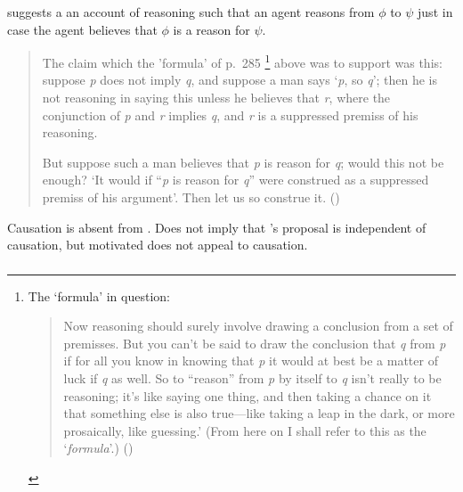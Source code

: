 \begin{note}
  \citeauthor{Thomson:1965vv} suggests a an account of reasoning such that an agent reasons from \(\phi\) to \(\psi\) just in case the agent believes that \(\phi\) is a reason for \(\psi\).
  \begin{quote}
    The claim which the 'formula' of p.\ 285\nolinebreak
    \footnote{
      The `formula' in question:
      \begin{quote}
        Now reasoning should surely involve drawing a conclusion from a set of premisses.
        But you can't be said to draw the conclusion that \emph{q} from \emph{p} if for all you know in knowing that \emph{p} it would at best be a matter of luck if \emph{q} as well.
        So to ``reason'' from \emph{p} by itself to \emph{q} isn't really to be reasoning; it's like saying one thing, and then taking a chance on it that something else is also true---like taking a leap in the dark, or more prosaically, like guessing.'
        (From here on I shall refer to this as the `\emph{formula}'.)\nolinebreak
        \mbox{}\hfill\mbox{(\citeyear[285]{Thomson:1965vv})}
      \end{quote}
    }
    above was to support was this:
    suppose \emph{p} does not imply \emph{q}, and suppose a man says `\emph{p}, so \emph{q}';
    then he is not reasoning in saying this unless he believes that \emph{r}, where the conjunction of \emph{p} and \emph{r} implies \emph{q}, and \emph{r} is a suppressed premiss of his reasoning.\par
    But suppose such a man believes that \emph{p} is reason for \emph{q}; would this not be enough?
    `It would if ``\emph{p} is reason for \emph{q}'' were construed as a suppressed premiss of his argument'.
    Then let us so construe it.\newline
    \mbox{}\hfill\mbox{(\citeyear[294]{Thomson:1965vv})}
  \end{quote}
  Causation is absent from \citeauthor{Thomson:1965vv}.
  Does not imply that \citeauthor{Thomson:1965vv}'s proposal is independent of causation, but motivated does not appeal to causation.
\end{note}

\subsubsection{\textcite{Longino:1978wv}}


